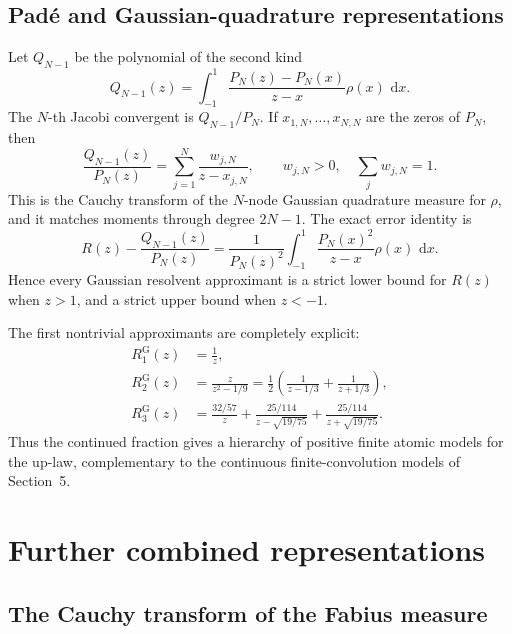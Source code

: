 \documentclass[11pt]{article}
\theoremstyle{definition}
\theoremstyle{remark}
\newcommand{\dd}{\,\mathrm d}
\begin{document}
\subsection{Pad\'e and Gaussian-quadrature representations}

Let \(Q_{N-1}\) be the polynomial of the second kind
\begin{equation}
 Q_{N-1}(z)=\int_{-1}^{1}
 \frac{P_N(z)-P_N(x)}{z-x}\rho(x)\,\dd x.                    \label{p1:eq:second-kind}
\end{equation}
The \(N\)-th Jacobi convergent is \(Q_{N-1}/P_N\).  If
\(x_{1,N},\dots,x_{N,N}\) are the zeros of \(P_N\), then
\begin{equation}
 \boxed{
 \frac{Q_{N-1}(z)}{P_N(z)}
 =\sum_{j=1}^{N}\frac{w_{j,N}}{z-x_{j,N}},
 \qquad w_{j,N}>0,\quad \sum_jw_{j,N}=1.
 }                                                           \label{p1:eq:gauss-partial}
\end{equation}
This is the Cauchy transform of the \(N\)-node Gaussian quadrature measure for \(\rho\),
and it matches moments through degree \(2N-1\).  The exact error identity is
\begin{equation}
 R(z)-\frac{Q_{N-1}(z)}{P_N(z)}
 =\frac1{P_N(z)^2}\int_{-1}^{1}
 \frac{P_N(x)^2}{z-x}\rho(x)\,\dd x.                        \label{p1:eq:Markov-error}
\end{equation}
Hence every Gaussian resolvent approximant is a strict lower bound for \(R(z)\) when
\(z>1\), and a strict upper bound when \(z<-1\).

The first nontrivial approximants are completely explicit:
\begin{align}
 R_1^{\mathrm G}(z)&=\frac1z,\\
 R_2^{\mathrm G}(z)&=\frac{z}{z^2-1/9}
 =\frac12\left(\frac1{z-1/3}+\frac1{z+1/3}\right),\\
 R_3^{\mathrm G}(z)&=
 \frac{32/57}{z}
 +\frac{25/114}{z-\sqrt{19/75}}
 +\frac{25/114}{z+\sqrt{19/75}}.
\end{align}
Thus the continued fraction gives a hierarchy of positive finite atomic models for the
up-law, complementary to the continuous finite-convolution models of Section~5.

\section{Further combined representations}

\subsection{The Cauchy transform of the Fabius measure}
\end{document}
